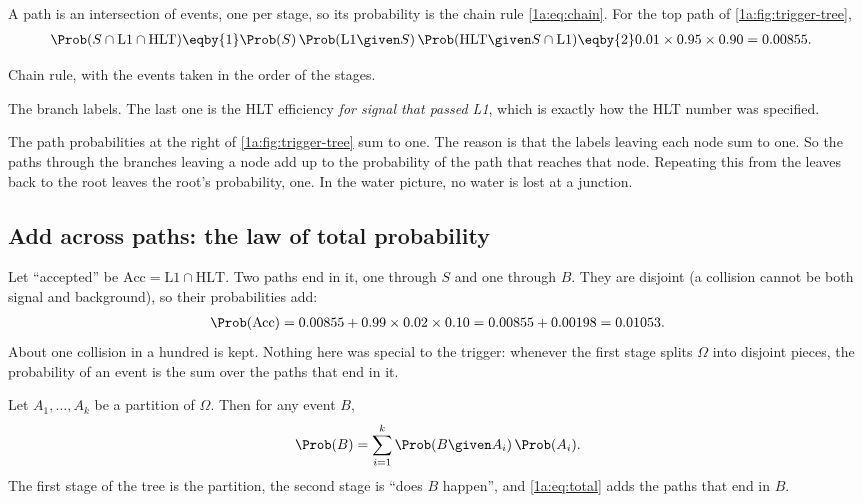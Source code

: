 A path is an intersection of events, one per stage, so its probability is the
chain rule \eqref{1a:eq:chain}. For the top path of \cref{1a:fig:trigger-tree},
\begin{align}
\Prob(S\cap\mathrm{L1}\cap\mathrm{HLT})
&\eqby{1}\Prob(S)\,\Prob(\mathrm{L1}\given S)\,\Prob(\mathrm{HLT}\given S\cap\mathrm{L1})
 \eqby{2}0.01\times0.95\times0.90=0.00855 .
\label{1a:eq:path}
\end{align}
\begin{explain}
  \item Chain rule, with the events taken in the order of the stages.
  \item The branch labels. The last one is the HLT efficiency \emph{for signal
        that passed L1}, which is exactly how the HLT number was specified.
\end{explain}
The path probabilities at the right of \cref{1a:fig:trigger-tree} sum to one.
The reason is that the labels leaving each node sum to one. So the paths
through the branches leaving a node add up to the probability of the path
that reaches that node. Repeating this from the leaves back to the root leaves
the root's probability, one. In the water picture, no water is lost at a
junction.

\subsection{Add across paths: the law of total probability}

Let ``accepted'' be $\mathrm{Acc}=\mathrm{L1}\cap\mathrm{HLT}$. Two paths end in it,
one through $S$ and one through $B$. They are disjoint (a collision cannot be
both signal and background), so their probabilities add:
\begin{align*}
\Prob(\mathrm{Acc})=0.00855+0.99\times0.02\times0.10=0.00855+0.00198=0.01053 .
\end{align*}
About one collision in a hundred is kept. Nothing here was special to the
trigger: whenever the first stage splits $\Omega$ into disjoint pieces, the
probability of an event is the sum over the paths that end in it.

\begin{keyidea}
Let $A_1,\dots,A_k$ be a partition of $\Omega$. Then for any event $B$,
\begin{equation}
\Prob(B)=\sum_{i=1}^k\Prob(B\given A_i)\,\Prob(A_i).
\label{1a:eq:total}
\end{equation}
The first stage of the tree is the partition, the second stage is ``does $B$
happen'', and \eqref{1a:eq:total} adds the paths that end in $B$.
\end{keyidea}

